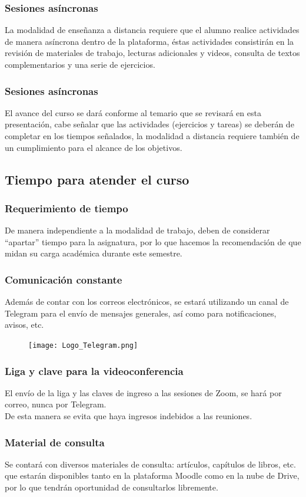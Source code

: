 \begin{frame}
\frametitle{Sesiones asíncronas}
La modalidad de enseñanza a distancia requiere que el alumno realice actividades de manera asíncrona dentro de la plataforma, éstas actividades consistirán en la revisión de materiales de trabajo, lecturas adicionales y videos, consulta de textos complementarios y una serie de ejercicios.
\end{frame}
\begin{frame}
\frametitle{Sesiones asíncronas}
El avance del curso se dará conforme al temario que se revisará en esta presentación, cabe señalar que las actividades (ejercicios y tareas) se deberán de completar en los tiempos señalados, la modalidad a distancia requiere también de un cumplimiento para el alcance de los objetivos.
\end{frame}
{

}

\subsection{Tiempo para atender el curso}

\begin{frame}
\frametitle{Requerimiento de tiempo}
De manera independiente a la modalidad de trabajo, deben de considerar \enquote{apartar} tiempo para la asignatura, por lo que hacemos la recomendación de que midan su carga académica durante este semestre.
\end{frame}
\begin{frame}
\frametitle{Comunicación constante}
Además de contar con los correos electrónicos, se estará utilizando un canal de Telegram para el envío de mensajes generales, así como para notificaciones, avisos, etc.
\\
\bigskip
\begin{figure}
    \centering
    \texttt{[image: Logo\_Telegram.png]}
\end{figure}
\end{frame}
\begin{frame}
\frametitle{Liga y clave para la videoconferencia}
El envío de la liga y las claves de ingreso a las sesiones de Zoom, se hará por correo, nunca por Telegram.
\\
\bigskip
De esta manera se evita que haya ingresos indebidos a las reuniones.
\end{frame}
\begin{frame}
\frametitle{Material de consulta}
Se contará con diversos materiales de consulta: artículos, capítulos de libros, etc. que estarán disponibles tanto en la plataforma Moodle como en la nube de Drive, por lo que tendrán oportunidad de consultarlos libremente.
\end{frame}

